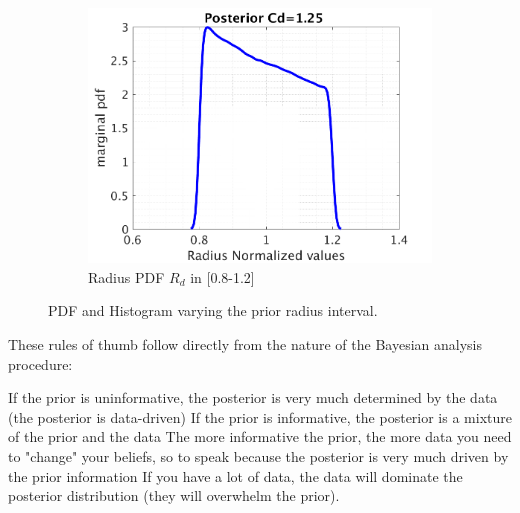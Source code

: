 \documentclass{article}
\begin{document}
\begin{figure}[H]
\begin{center}
\begin{subfigure}{0.4\textwidth}
    \centering\includegraphics[width=1.1\textwidth,keepaspectratio]{images/inverse_problem/infer_radius/drag_125/range_long/radiusraw_PDF.png}
    \caption{\centering Radius PDF  $R_d$ in [0.8-1.2]}
  \end{subfigure}


\caption{PDF and Histogram varying the prior radius interval.}
\label{fig:radius_interval} 
 \end{center}
\end{figure}

These rules of thumb follow directly from the nature of the Bayesian analysis procedure:

If the prior is uninformative, the posterior is very much determined by the data (the posterior is data-driven)
If the prior is informative, the posterior is a mixture of the prior and the data
The more informative the prior, the more data you need to "change" your beliefs, so to speak because the posterior is very much driven by the prior information
If you have a lot of data, the data will dominate the posterior distribution (they will overwhelm the prior).




















%
\end{document}
